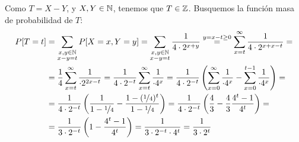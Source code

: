 \begin{ejercicio}
\begin{enumerate}
        Como $T=X-Y$, y $X,Y\in\mathbb{N}$, tenemos que $T\in\mathbb{Z}$. Busquemos la función masa de probabilidad de $T$:
        \begin{align*}
            P[T=t]&=\sum_{\substack{x,y\in\mathbb{N} \\ x-y=t}} P[X=x,Y=y]
            = \sum_{\substack{x,y\in\mathbb{N} \\ x-y=t}} \dfrac{1}{4\cdot 2^{x+y}}
            \stackrel{y=x-t\geq 0}{=} \sum_{x=t}^{\infty}\dfrac{1}{4\cdot 2^{x+x-t}}
            =\\&= \dfrac{1}{4}\sum_{x=t}^{\infty}\dfrac{1}{\cdot 2^{2x-t}}
            = \dfrac{1}{4\cdot 2^{-t}}\sum_{x=t}^{\infty}\dfrac{1}{\cdot 4^x}
            = \dfrac{1}{4\cdot 2^{-t}}\left(\sum_{x=0}^{\infty}\dfrac{1}{\cdot 4^x}-  \sum_{x=0}^{t-1}\dfrac{1}{\cdot 4^x}\right)
            =\\&= \dfrac{1}{4\cdot 2^{-t}}\left(\frac{1}{1-\nicefrac{1}{4}}-  \frac{1-(\nicefrac{1}{4})^t}{1-\nicefrac{1}{4}}\right)
            = \dfrac{1}{4\cdot 2^{-t}}\left(\frac{4}{3}-  \frac{4}{3}\frac{4^t-1}{4^t}\right)
            =\\&= \dfrac{1}{3\cdot 2^{-t}}\left(1-\frac{4^t-1}{4^t}\right)
            = \dfrac{1}{3\cdot 2^{-t}\cdot 4^t}
            = \dfrac{1}{3\cdot 2^{t}}
        \end{align*}
    \end{enumerate}
\end{ejercicio}

